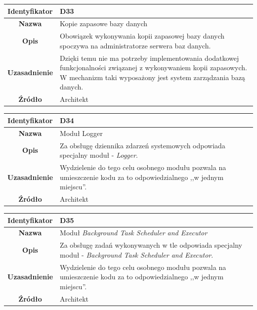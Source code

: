 \begin{table}[H]
\centering
\begin{tabular}{ | >{\bfseries}c | p{11cm} | }
\hline
%
Identyfikator & D33 \\ \hline
Nazwa & Kopie zapasowe bazy danych \\ \hline
Opis & Obowiązek wykonywania kopii zapasowej bazy danych spoczywa na administratorze serwera baz danych. \\ \hline
Uzasadnienie & Dzięki temu nie ma potrzeby implementowania dodatkowej funkcjonalności związanej z wykonywaniem kopii zapasowych. W mechanizm taki wyposażony jest system zarządzania bazą danych. \\ \hline
Źródło & Architekt \\ \hline
%
\end{tabular}
\end{table}

\begin{table}[H]
\centering
\begin{tabular}{ | >{\bfseries}c | p{11cm} | }
\hline
%
Identyfikator & D34 \\ \hline
Nazwa & Moduł Logger \\ \hline
Opis & Za obsługę dziennika zdarzeń systemowych odpowiada specjalny moduł - \textit{Logger}. \\ \hline
Uzasadnienie & Wydzielenie do tego celu osobnego modułu pozwala na umieszczenie kodu za to odpowiedzialnego ,,w jednym miejscu''. \\ \hline
Źródło & Architekt \\ \hline
%
\end{tabular}
\end{table}

\begin{table}[H]
\centering
\begin{tabular}{ | >{\bfseries}c | p{11cm} | }
\hline
%
Identyfikator & D35 \\ \hline
Nazwa & Moduł \textit{Background Task Scheduler and Executor} \\ \hline
Opis & Za obsługę zadań wykonywanych w tle odpowiada specjalny moduł - \textit{Background Task Scheduler and Executor}. \\ \hline
Uzasadnienie & Wydzielenie do tego celu osobnego modułu pozwala na umieszczenie kodu za to odpowiedzialnego ,,w jednym miejscu''. \\ \hline
Źródło & Architekt \\ \hline
%
\end{tabular}
\end{table}

